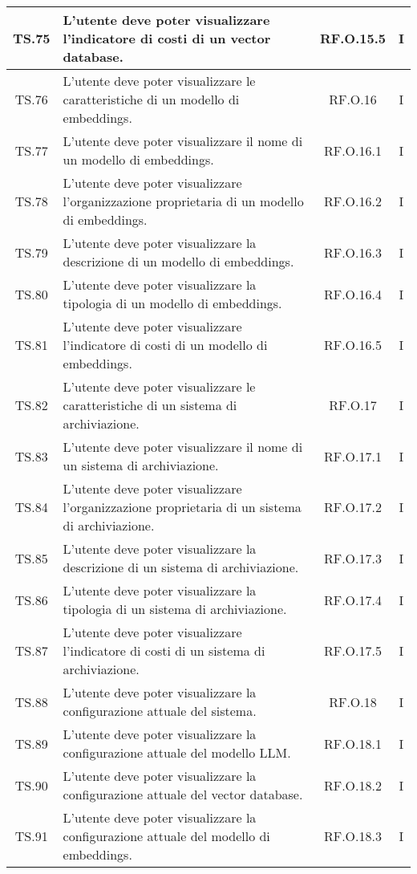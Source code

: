 {{{{{{{{{{\begin{xltabular}{\textwidth}{|c|X|c|c|}
    \hline
    TS.75 & L’utente deve poter visualizzare l’indicatore di costi di un vector database. & RF.O.15.5 & I \\
    \hline
    TS.76 & L’utente deve poter visualizzare le caratteristiche di un modello di embeddings. & RF.O.16 & I \\
    \hline
    TS.77 & L’utente deve poter visualizzare il nome di un modello di embeddings. & RF.O.16.1 & I \\
    \hline
    TS.78 & L’utente deve poter visualizzare l’organizzazione proprietaria di un modello di embeddings. & RF.O.16.2 & I \\
    \hline
    TS.79 & L’utente deve poter visualizzare la descrizione di un modello di embeddings. & RF.O.16.3 & I \\
    \hline
    TS.80 & L’utente deve poter visualizzare la tipologia di un modello di embeddings. & RF.O.16.4 & I \\
    \hline
    TS.81 & L’utente deve poter visualizzare l’indicatore di costi di un modello di embeddings. & RF.O.16.5 & I \\
    \hline
    TS.82 & L’utente deve poter visualizzare le caratteristiche di un sistema di archiviazione. & RF.O.17 & I \\
    \hline
    TS.83 & L’utente deve poter visualizzare il nome di un sistema di archiviazione. & RF.O.17.1 & I \\
    \hline
    TS.84 & L’utente deve poter visualizzare l’organizzazione proprietaria di un sistema di archiviazione. & RF.O.17.2 & I \\
    \hline
    TS.85 & L’utente deve poter visualizzare la descrizione di un sistema di archiviazione. & RF.O.17.3 & I \\
    \hline
    TS.86 & L’utente deve poter visualizzare la tipologia di un sistema di archiviazione. & RF.O.17.4 & I \\
    \hline
    TS.87 & L’utente deve poter visualizzare l’indicatore di costi di un sistema di archiviazione. & RF.O.17.5 & I \\
    \hline
    TS.88 & L’utente deve poter visualizzare la configurazione attuale del sistema. & RF.O.18 & I \\
    \hline
    TS.89 & L’utente deve poter visualizzare la configurazione attuale del modello LLM. & RF.O.18.1 & I \\
    \hline
    TS.90 & L’utente deve poter visualizzare la configurazione attuale del vector database. & RF.O.18.2 & I \\
    \hline
    TS.91 & L’utente deve poter visualizzare la configurazione attuale del modello di embeddings. & RF.O.18.3 & I \\

\end{xltabular}}}}}}}}}}}
